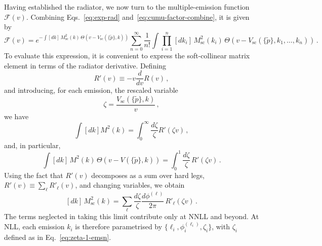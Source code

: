 Having established the radiator, we now turn to the multiple-emission
function $\mathcal{F}(v)$. Combining Eqs.~\eqref{eq:exp-rad}
and~\eqref{eq:cumu-factor-combine}, it is given by
\begin{equation}
  \label{eq:Fv-sc}
  \mathcal{F}(v) = e^{-\int[dk]\,M_{\mathrm{sc}}^2(k)\,\Theta(v-V_{\mathrm{sc}}(\{\tilde{p}\},k))}
  \sum_{n=0}^\infty\frac{1}{n!}
  \int\!\prod_{i=1}^n[dk_i]\,M_{\mathrm{sc}}^2\!\left(k_i\right)
  \,\Theta\!\left(v-V_{\mathrm{sc}}\!\left(\{\tilde{p}\},k_1,\dots,k_n\right)\right)\,.
\end{equation}
To evaluate this expression, it is convenient to express the soft-collinear
matrix element in terms of the radiator derivative. Defining
\begin{equation}
	R'(v)\equiv-v\frac{d}{dv}R(v)\,,
\end{equation}
and introducing, for each emission, the rescaled variable
\begin{equation}
\label{eq:zeta-1-emsn}
	\zeta=\frac{V_{\mathrm{sc}}(\{\tilde{p}\},k)}{v}\,,
\end{equation}
we have
\begin{equation}
	\int [dk] M^2(k)=\int_0^\infty \frac{d\zeta}{\zeta} R'(\zeta v)\,,
\end{equation}
and, in particular,
\begin{equation}
\int[dk]\,M^2(k)\,\Theta\!\left(v-V(\{\tilde{p}\},k)\right)=\int_0^1 \frac{d\zeta}{\zeta}\, R'(\zeta v)\,.
\end{equation}
 Using the fact that $R'(v)$ decomposes
as a sum over hard legs, $R'(v)\equiv\sum_\ell R'_\ell(v)$,
and changing variables, we obtain 
\begin{equation} 
\label{eq:measure-replace}
[dk]\,M_{\mathrm{sc}}^2(k)=\sum_{\ell}\frac{d\zeta}{\zeta}\frac{d\phi^{(\ell)}}{2\pi}\,R'_{\ell}(\zeta v)\,.
\end{equation}
The terms neglected in taking this limit contribute only at NNLL and beyond. At
NLL, each emission $k_i$ is therefore parametrised by
$\{\ell_i,\phi_i^{(\ell_i)},\zeta_i\}$, with $\zeta_i$ defined as in
Eq.~\eqref{eq:zeta-1-emsn}. 

